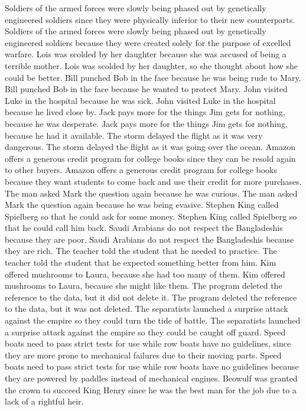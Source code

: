 \documentclass{article}
\begin{document}
\begin{enumerate}
	Soldiers of the armed forces were slowly being phased out by genetically engineered soldiers since they were physically inferior to their new counterparts.
	Soldiers of the armed forces were slowly being phased out by genetically engineered soldiers because they were created solely for the purpose of excelled warfare.
	Lois was scolded by her daughter because she was accused of being a terrible mother.
	Lois was scolded by her daughter, so she thought about how she could be better.
	Bill punched Bob in the face because he was being rude to Mary.
	Bill punched Bob in the face because he wanted to protect Mary.
	John visited Luke in the hospital because he was sick.
	John visited Luke in the hospital because he lived close by.
	Jack pays more for the things Jim gets for nothing, because he was desperate.
	Jack pays more for the things Jim gets for nothing, because he had it available.
	The storm delayed the flight as it was very dangerous.
	The storm delayed the flight as it was going over the ocean.
	Amazon offers a generous credit program for college books since they can be resold again to other buyers.
	Amazon offers a generous credit program for college books because they want students to come back and use their credit for more purchases.
	The man asked Mark the question again because he was curious.
	The man asked Mark the question again because he was being evasive.
	Stephen King called Spielberg so that he could ask for some money.
	Stephen King called Spielberg so that he could call him back.
	Saudi Arabians do not respect the Bangladeshis because they are poor.
	Saudi Arabians do not respect the Bangladeshis because they are rich.
	The teacher told the student that he needed to practice.
	The teacher told the student that he expected something better from him.
	Kim offered mushrooms to Laura, because she had too many of them.
	Kim offered mushrooms to Laura, because she might like them.
	The program deleted the reference to the data, but it did not delete it.
	The program deleted the reference to the data, but it was not deleted.
	The separatists launched a surprise attack against the empire so they could turn the tide of battle.
	The separatists launched a surprise attack against the empire so they could be caught off guard.
	Speed boats need to pass strict tests for use while row boats have no guidelines, since they are more prone to mechanical failures due to their moving parts.
	Speed boats need to pass strict tests for use while row boats have no guidelines because they are powered by paddles instead of mechanical engines.
	Beowulf was granted the crown to succeed King Henry since he was the best man for the job due to a lack of a rightful heir.

\end{enumerate}
\end{document}
